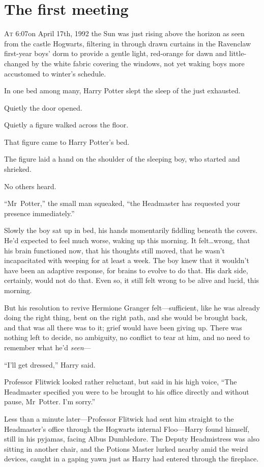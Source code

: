 
\section{The first meeting}

\lettrine{A}{t} 6:07\am on April 17th, 1992 the Sun was just rising above the horizon as seen from the castle Hogwarts, filtering in through drawn curtains in the Ravenclaw first-year boys’ dorm to provide a gentle light, red-orange for dawn and little-changed by the white fabric covering the windows, not yet waking boys more accustomed to winter’s schedule.

In one bed among many, Harry Potter slept the sleep of the just exhausted.

Quietly the door opened.

Quietly a figure walked across the floor.

That figure came to Harry Potter’s bed.

The figure laid a hand on the shoulder of the sleeping boy, who started and shrieked.

No others heard.

“Mr~Potter,” the small man squeaked, “the Headmaster has requested your presence immediately.”

Slowly the boy sat up in bed, his hands momentarily fiddling beneath the covers. He’d expected to feel much worse, waking up this morning. It felt…wrong, that his brain functioned now, that his thoughts still moved, that he wasn’t incapacitated with weeping for at least a week. The boy knew that it wouldn’t have been an adaptive response, for brains to evolve to do that. His dark side, certainly, would not do that. Even so, it still felt wrong to be alive and lucid, this morning.

But his resolution to revive Hermione Granger felt—sufficient, like he was already doing the right thing, bent on the right path, and she would be brought back, and that was all there was to it; grief would have been giving up. There was nothing left to decide, no ambiguity, no conflict to tear at him, and no need to remember what he’d \emph{seen}—

“I’ll get dressed,” Harry said.

Professor Flitwick looked rather reluctant, but said in his high voice, “The Headmaster specified you were to be brought to his office directly and without pause, Mr~Potter. I’m sorry.”

Less than a minute later—Professor Flitwick had sent him straight to the Headmaster’s office through the Hogwarts internal Floo—Harry found himself, still in his pyjamas, facing Albus Dumbledore. The Deputy Headmistress was also sitting in another chair, and the Potions Master lurked nearby amid the weird devices, caught in a gaping yawn just as Harry had entered through the fireplace.

